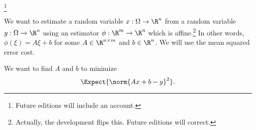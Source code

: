 

\footnote{Future editions will include an account.}


We want to estimate a random variable $x: \Omega \to \R^n$ from a random variable $y: \Omega \to \R^n$ using an estimator $\phi: \R^m \to \R^n$ which is affine.\footnote{Actually, the development flips this. Future editions will correct.}
In other words, $\phi(\xi) = A\xi + b$ for some $A \in \R^{n \times m}$ and $b \in \R^n$.
We will use the mean squared error cost.

We want to find $A$ and $b$ to minimize
$$
  \Expect{\norm{Ax + b - y}^2}.
$$
